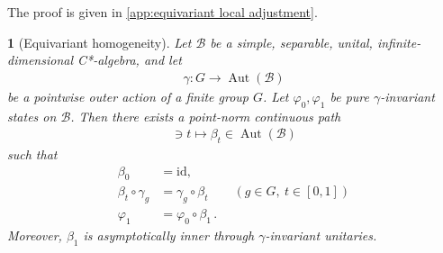 \documentclass[a4paper,10pt]{article}
\numberwithin{equation}{section}
\theoremstyle{plain}
\theoremstyle{plain}
\newtheorem{lem}[lem]{\protect\lemmaname}
\theoremstyle{plain}
\theoremstyle{plain}
\theoremstyle{plain}
\theoremstyle{remark}
\theoremstyle{definition}
\providecommand{\lemmaname}{Lemma}
\newcommand{\calB}{\mathcal{B}}
\newcommand{\eq}[1]{\begin{align*}#1\end{align*}}
\begin{document}
The proof is given in
\cref{app:equivariant local adjustment}.

\begin{lem}[Equivariant homogeneity]
\label{lem:equivariant homogeneity}
Let \(\calB\) be a simple, separable, unital, infinite-dimensional
C*-algebra, and let
\eq{
    \gamma:G\longrightarrow\operatorname{Aut}(\calB)
}
be a pointwise outer action of a finite group \(G\). Let
\(\varphi_0,\varphi_1\) be pure \(\gamma\)-invariant states on
\(\calB\). Then there exists a point-norm continuous path
\eq{
    [0,1]\ni t
    \longmapsto
    \beta_t\in\operatorname{Aut}(\calB)
}
such that
\eq{
    \beta_0
    &=
    \mathrm{id},\\
    \beta_t\circ\gamma_g
    &=
    \gamma_g\circ\beta_t
    \qquad
    (g\in G,\ t\in[0,1])\\
    \varphi_1
    &=
    \varphi_0\circ\beta_1\,.
}
Moreover, \(\beta_1\) is asymptotically inner through
\(\gamma\)-invariant unitaries.
\end{lem}
\end{document}
